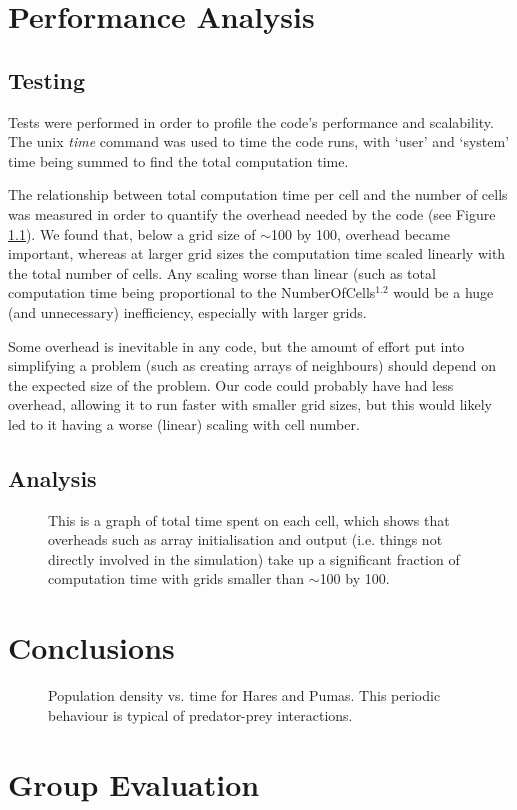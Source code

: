 \documentclass[11pt]{report}
\begin{document}
\chapter{Performance Analysis}
   \section{Testing} %
   
   Tests were performed in order to profile the code's performance and scalability. The unix \emph{time} command was 
   used to time the code runs, with `user' and `system' time being summed to find the total computation time.\newline{}
   
   The relationship between total computation time per cell and the number of cells was measured in order to quantify the overhead
   needed by the code (see Figure \ref{overhead}). We found that, below a grid size of $\sim$100 by 100, overhead became important, whereas at 
   larger grid sizes the computation time scaled linearly with the total number of cells. Any scaling worse than linear (such as 
   total computation time being proportional to the NumberOfCells$^{1.2}$ would be a huge (and unnecessary) inefficiency, especially with larger grids.\newline{}
   
   Some overhead is inevitable in any code, but the amount of effort put into simplifying a problem (such as creating arrays of neighbours)
   should depend on the expected size of the problem. Our code could probably have had less overhead, allowing it to run faster with smaller grid sizes,
   but this would likely led to it having a worse (linear) scaling with cell number.
   
   
   
   \section{Analysis} %
   
   \begin{figure}[h]
   
   
   \caption{\label{overhead}This is a graph of total time spent on each cell, which shows that overheads such as array initialisation
   and output (i.e. things not directly involved in the simulation) take up a significant fraction of computation
   time with grids smaller than $\sim$100 by 100.}
   \end{figure}

  




\chapter{Conclusions} %

   \begin{figure}[h]
   
   
   \caption{Population density vs. time for Hares and Pumas. This periodic behaviour is typical of predator-prey interactions.}
   \end{figure}

\chapter{Group Evaluation} %
\end{document}
